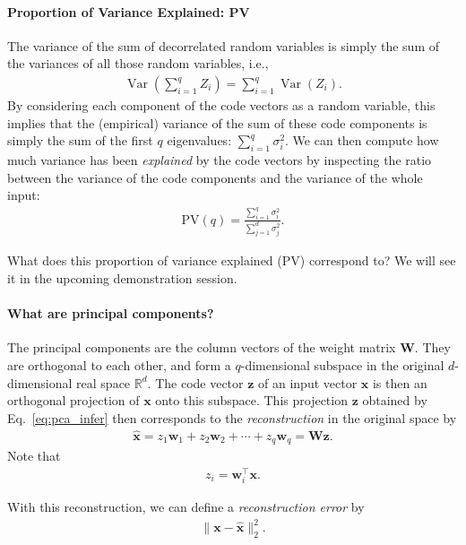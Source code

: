 \documentclass{report}
\newcommand{\vect}[1]{\mathbf{#1}}
\newcommand{\matr}[1]{\mathbf{#1}}
\newcommand{\var}[0]{\operatorname{Var}}
\newcommand{\vx}[0]{\vect{x}}
\newcommand{\vz}[0]{\vect{z}}
\newcommand{\vw}[0]{\vect{w}}
\newcommand{\mW}[0]{\matr{W}}
\newcommand{\RR}[0]{\mathbb{R}}
\begin{document}
\paragraph{Proportion of Variance Explained: PV}

The variance of the sum of decorrelated random variables is simply the sum of
the variances of all those random variables, i.e.,
\begin{align*}
    \var(\sum_{i=1}^q Z_i) = \sum_{i=1}^q \var(Z_i).
\end{align*}
By considering each component of the code vectors as a random variable, this
implies that the (empirical) variance of the sum of these code components is
simply the sum of the first $q$ eigenvalues: $\sum_{i=1}^q \sigma_i^2$. We can
then compute how much variance has been {\it explained} by the code vectors by
inspecting the ratio between the variance of the code components and the
variance of the whole input:
\begin{align*}
    \text{PV}(q) = \frac{
        \sum_{i=1}^q \sigma_i^2
    }{
        \sum_{j=1}^d \sigma_j^2
    }.
\end{align*}

What does this proportion of variance explained (PV) correspond to? We will see
it in the upcoming demonstration session.

\paragraph{What are principal components?}

The principal components are the column vectors of the weight matrix $\mW$.
They are orthogonal to each other, and form a $q$-dimensional subspace in the
original $d$-dimensional real space $\RR^d$. The code vector $\vz$ of an input
vector $\vx$ is then an orthogonal projection of $\vx$ onto this subspace. This
projection $\vz$ obtained by Eq.~\eqref{eq:pca_infer} then corresponds to the
{\it reconstruction} in the original space by
\begin{align}
    \label{eq:pca_recon}
    \hat{\vx} = z_1 \vw_1 + z_2 \vw_2 + \cdots + z_q \vw_q = \mW \vz.
\end{align}
Note that
\begin{align*}
    z_i = \vw_i^\top \vx.
\end{align*}

With this reconstruction, we can define a {\it reconstruction error} by
\begin{align*}
    \| \vx - \hat{\vx} \|^2_2.
\end{align*}
\end{document}
